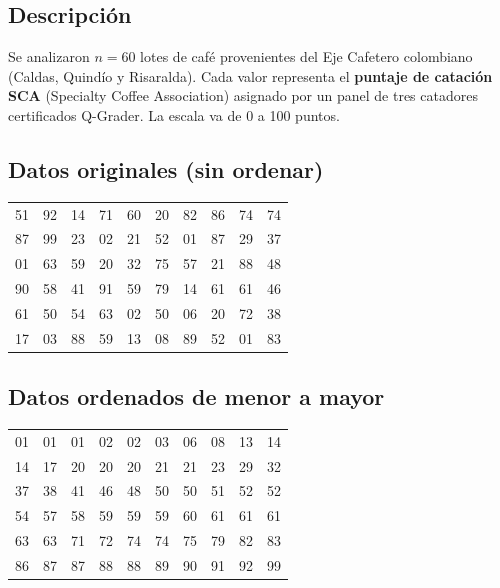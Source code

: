 \documentclass[12pt,a4paper]{article}
\begin{document}
\subsection{Descripción}

Se analizaron $n = 60$ lotes de café provenientes del Eje Cafetero colombiano (Caldas, Quindío y Risaralda). Cada valor representa el \textbf{puntaje de catación SCA} (Specialty Coffee Association) asignado por un panel de tres catadores certificados Q-Grader. La escala va de 0 a 100 puntos.

\subsection{Datos originales (sin ordenar)}

\begin{center}
\colorbox{grisclaro}{%
\begin{minipage}{0.88\textwidth}
\vspace{6pt}
\centering
\begin{tabular}{cccccccccc}
51 & 92 & 14 & 71 & 60 & 20 & 82 & 86 & 74 & 74 \\
87 & 99 & 23 & 02 & 21 & 52 & 01 & 87 & 29 & 37 \\
01 & 63 & 59 & 20 & 32 & 75 & 57 & 21 & 88 & 48 \\
90 & 58 & 41 & 91 & 59 & 79 & 14 & 61 & 61 & 46 \\
61 & 50 & 54 & 63 & 02 & 50 & 06 & 20 & 72 & 38 \\
17 & 03 & 88 & 59 & 13 & 08 & 89 & 52 & 01 & 83 \\
\end{tabular}
\vspace{6pt}
\end{minipage}
}
\end{center}

\subsection{Datos ordenados de menor a mayor}

\begin{center}
\begin{tabular}{cccccccccc}
\toprule
01 & 01 & 01 & 02 & 02 & 03 & 06 & 08 & 13 & 14 \\
14 & 17 & 20 & 20 & 20 & 21 & 21 & 23 & 29 & 32 \\
37 & 38 & 41 & 46 & 48 & 50 & 50 & 51 & 52 & 52 \\
54 & 57 & 58 & 59 & 59 & 59 & 60 & 61 & 61 & 61 \\
63 & 63 & 71 & 72 & 74 & 74 & 75 & 79 & 82 & 83 \\
86 & 87 & 87 & 88 & 88 & 89 & 90 & 91 & 92 & 99 \\
\bottomrule
\end{tabular}
\end{center}
\end{document}
